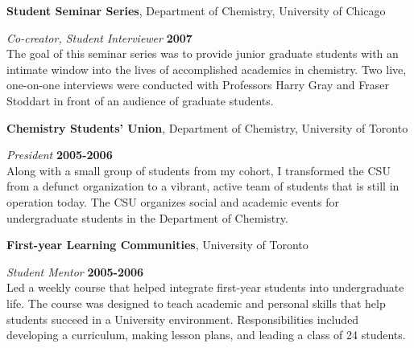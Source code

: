 \documentclass[margin,line]{res}
\begin{document}
\begin{resume}
{\bf Student Seminar Series}, Department of Chemistry, University of Chicago

\vspace{-.3cm}
{\em Co-creator, Student Interviewer} \hfill {\bf 2007}\\
The goal of this seminar series was to provide junior graduate students with an intimate window into
the lives of accomplished academics in chemistry. Two live, one-on-one interviews were conducted
with Professors Harry Gray and Fraser Stoddart in front of an audience of graduate students.

{\bf Chemistry Students' Union}, Department of Chemistry, University of Toronto

\vspace{-.3cm}
{\em President} \hfill {\bf 2005-2006}\\
Along with a small group of students from my cohort, I transformed the CSU from a defunct
organization to a vibrant, active team of students that is still in operation today. The CSU organizes
social and academic events for undergraduate
students in the Department of Chemistry.

{\bf First-year Learning Communities}, University of Toronto

\vspace{-.3cm}
{\em Student Mentor} \hfill {\bf 2005-2006}\\
Led a weekly course that helped integrate first-year students into undergraduate life.
The course was designed to teach academic and personal skills that help students succeed in a University environment.
Responsibilities included developing a curriculum, making lesson plans, and leading a class of 24 students.

\end{resume}
\end{document}
